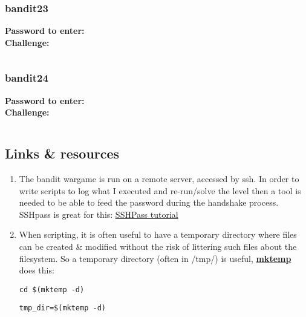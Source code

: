 \documentclass[a4paper]{article}
\newcommand{\pass}[1]{\textbf{Password to enter:} \textit{#1}\\}
\newcommand{\chall}{\textbf{Challenge:} }
\begin{document}
\subsubsection{bandit23}
\pass{ }
\chall 
\begin{lstlisting}

\end{lstlisting}

\subsubsection{bandit24}
\pass{ }
\chall 
\begin{lstlisting}

\end{lstlisting}
\subsection*{Links \& resources}
\begin{enumerate}
\item The bandit wargame is run on a remote server, accessed by ssh. In order to write scripts to log what I executed and re-run/solve the level then a tool is needed to be able to feed the password during the handshake process. SSHpass is great for this: \href{https://askubuntu.com/questions/224181/how-do-i-include-a-password-with-ssh-command-want-to-make-shell-script}{SSHPass tutorial} 

\item When scripting, it is often useful to have a temporary directory where files can be created \& modified without the risk of littering such files about the filesystem. So a temporary directory (often in /tmp/) is useful, \href{https://code-maven.com/create-temporary-directory-on-linux-using-bash}{\textbf{mktemp}} does this:
	\begin{lstlisting}[title=move to the new temporary directory]
	cd $(mktemp -d)
	\end{lstlisting}
	\begin{lstlisting}[title=store the new temporary directory path]
	tmp_dir=$(mktemp -d)
	\end{lstlisting}
\end{enumerate}
\end{document}
